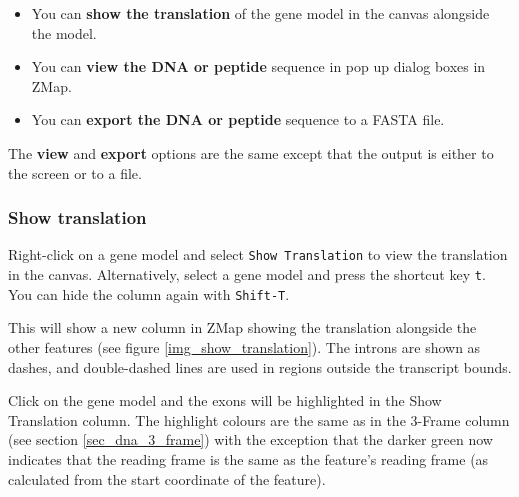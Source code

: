 \documentclass[letterpaper]{article}
\begin{document}
\begin{itemize}
\item You can \textbf{show the translation} of the gene model in the canvas alongside the model.
\item You can \textbf{view the DNA or peptide} sequence in pop up dialog boxes in ZMap.
\item You can \textbf{export the DNA or peptide} sequence to a FASTA file.
\end{itemize}

The \textbf{view} and \textbf{export} options are the same except that the output is either to the screen or to a file.

\subsubsection{Show translation}
Right-click on a gene model and select \lstinline{Show Translation} to view the translation in the canvas. Alternatively, select a gene model and press the shortcut key \lstinline{t}. You can hide the column again with \lstinline{Shift-T}.

This will show a new column in ZMap showing the translation alongside the other features (see figure \ref{img_show_translation}). The introns are shown as dashes, and double-dashed lines are used in regions outside the transcript bounds.

Click on the gene model and the exons will be highlighted in the Show Translation column. The highlight colours are the same as in the 3-Frame column (see section \ref{sec_dna_3_frame}) with the exception that the darker green now indicates that the reading frame is the same as the feature's reading frame (as calculated from the start coordinate of the feature).
\end{document}
